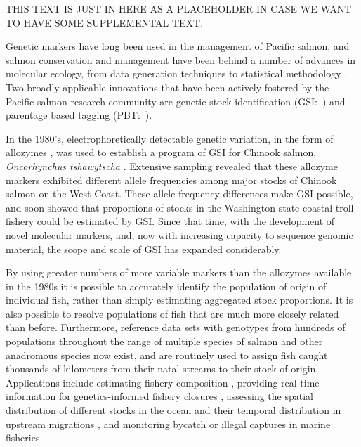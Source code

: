 
THIS TEXT IS JUST IN HERE AS A PLACEHOLDER IN CASE WE WANT TO
HAVE SOME SUPPLEMENTAL TEXT.


Genetic markers have long been used in the 
management of Pacific salmon, and salmon conservation and management have been
behind a number of advances in molecular ecology,
from data generation techniques \citep{clemento2011discovery,campbell2015genotyping,mckinney2017managing}
to statistical methodology
\citep{smouse1990genetic,anderson2002model,pella2006gibbs}.
Two broadly applicable innovations that have been
actively fostered by the Pacific salmon research community are genetic
stock identification
(GSI:~\citealt{milner1982genetic,beacham2004dna,seeb2007development})
and parentage based tagging
(PBT:~\citealt{anderson2006power, garza2007large, abadia2013large, steele2013validation}).  



 In the 1980's, electrophoretically
detectable genetic variation, in the form of allozymes
\citep{ayala1972allozymes,allendorf1981use}, was used to
establish a program of GSI for Chinook salmon,
{\em Oncorhynchus tshawytscha} \citep{milner1982genetic}.  Extensive sampling
revealed that these allozyme markers
exhibited different allele frequencies among major stocks of Chinook salmon on the West Coast.
These allele frequency differences make GSI possible, and
\citet{milner1985genetic} soon showed that proportions of stocks in
the Washington state coastal troll fishery could be estimated by GSI.
Since that time, with the development of novel molecular markers, and, now
with increasing capacity to sequence genomic material, the scope and scale of GSI
has expanded considerably.

By using greater numbers of more variable markers than the allozymes available
in the 1980s it is possible to accurately
identify the population of origin of individual fish, rather than simply estimating
aggregated stock proportions.  It is also possible to resolve populations of fish that
are much more closely related than before.  Furthermore, reference data sets with genotypes
from hundreds of populations throughout the range of multiple species of salmon and
other anadromous species
\citep{seeb2007development,gilbey2018microsatellite,barclay2019genetic} now exist, and are routinely used to assign fish caught thousands of
kilometers from their natal streams to their stock of origin. Applications include estimating fishery
composition \citep{satterthwaite2015stock}, providing real-time information for genetics-informed fishery closures \citep{beacham2004dna}, assessing the spatial distribution of different stocks in the
ocean \citep{urawa2009stock} and their temporal distribution in upstream migrations
\citep{hess2014monitoring},  and monitoring  bycatch \citep{hasselman2016genetic} or illegal captures \citep{wilmot1999origins} in marine fisheries.

